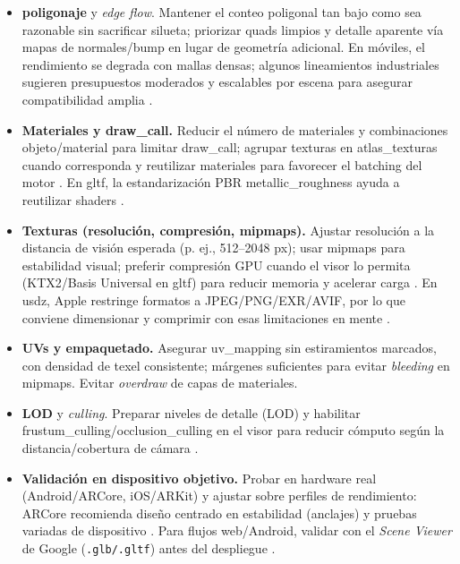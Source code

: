 \begin{itemize}
  \item \textbf{\gls{poligonaje}} y \textit{edge flow}. Mantener el conteo poligonal tan bajo como sea razonable sin sacrificar silueta; priorizar quads limpios y detalle aparente vía mapas de \gls{normales}/bump en lugar de geometría adicional. En móviles, el rendimiento se degrada con \gls{malla}s densas; algunos lineamientos industriales sugieren presupuestos moderados y escalables por escena para asegurar compatibilidad amplia \cite{GoogleARCorePerf}.
  \item \textbf{Materiales y \gls{draw_call}.} Reducir el número de materiales y combinaciones objeto/material para limitar \gls{draw_call}; agrupar texturas en \gls{atlas_texturas} cuando corresponda y reutilizar materiales para favorecer el batching del motor \cite{UnityDrawCalls2022}. En \gls{gltf}, la estandarización \gls{PBR} \gls{metallic_roughness} ayuda a reutilizar \gls{shader}s \cite{KhronosGLTFSpec}.
  \item \textbf{Texturas (resolución, compresión, mipmaps).} Ajustar resolución a la distancia de visión esperada (p. ej., 512–2048 px); usar mipmaps para estabilidad visual; preferir compresión GPU cuando el visor lo permita (KTX2/Basis Universal en \gls{gltf}) para reducir memoria y acelerar carga \cite{KhronosKTX2Overview}. En \gls{usdz}, Apple restringe formatos a JPEG/PNG/EXR/AVIF, por lo que conviene dimensionar y comprimir con esas limitaciones en mente \cite{AppleUSDCreate}.
  \item \textbf{UVs y empaquetado.} Asegurar \gls{uv_mapping} sin estiramientos marcados, con densidad de texel consistente; márgenes suficientes para evitar \textit{bleeding} en mipmaps. Evitar \textit{overdraw} de capas de materiales.
  \item \textbf{\gls{LOD}} y \textit{culling}. Preparar niveles de detalle (\gls{LOD}) y habilitar \gls{frustum_culling}/\gls{occlusion_culling} en el visor para reducir cómputo según la distancia/cobertura de cámara \cite{UnityDrawCalls2022}.
  \item \textbf{Validación en dispositivo objetivo.} Probar en hardware real (Android/\gls{ARCore}, iOS/ARKit) y ajustar sobre perfiles de rendimiento: ARCore recomienda diseño centrado en estabilidad (anclajes) y pruebas variadas de dispositivo \cite{GoogleARCorePerf}. Para flujos web/Android, validar con el \textit{Scene Viewer} de Google (\texttt{.glb/.gltf}) antes del despliegue \cite{GoogleSceneViewer}.
\end{itemize}


